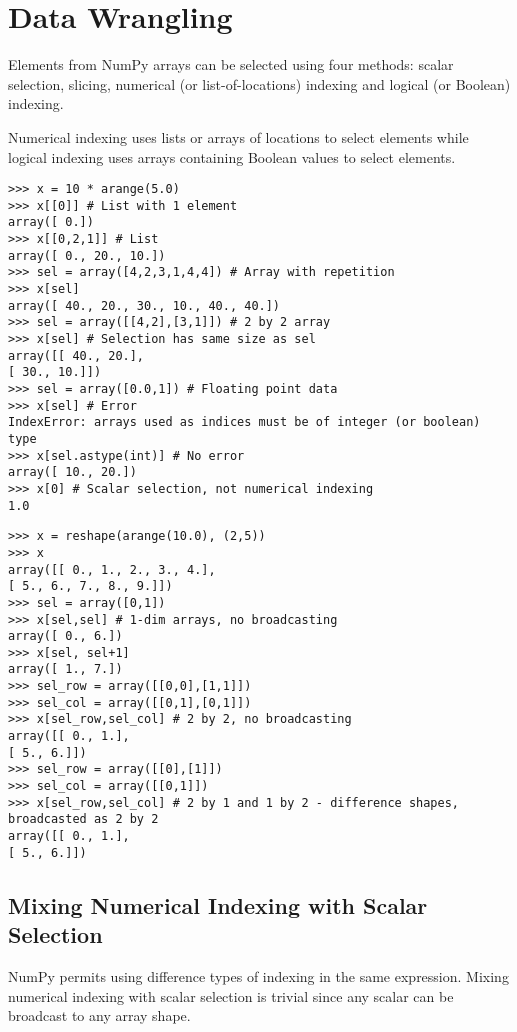 \documentclass[KSmain.tex]{subfiles}
\begin{document}
 

\section{Data Wrangling}
Elements from NumPy arrays can be selected using four methods: scalar selection, slicing, numerical (or
list-of-locations) indexing and logical (or Boolean) indexing.

Numerical indexing uses lists or arrays of locations
to select elements while logical indexing uses arrays containing Boolean values to select elements.


\begin{framed}
\begin{verbatim}
>>> x = 10 * arange(5.0)
>>> x[[0]] # List with 1 element
array([ 0.])
>>> x[[0,2,1]] # List
array([ 0., 20., 10.])
>>> sel = array([4,2,3,1,4,4]) # Array with repetition
>>> x[sel]
array([ 40., 20., 30., 10., 40., 40.])
>>> sel = array([[4,2],[3,1]]) # 2 by 2 array
>>> x[sel] # Selection has same size as sel
array([[ 40., 20.],
[ 30., 10.]])
>>> sel = array([0.0,1]) # Floating point data
>>> x[sel] # Error
IndexError: arrays used as indices must be of integer (or boolean) type
>>> x[sel.astype(int)] # No error
array([ 10., 20.])
>>> x[0] # Scalar selection, not numerical indexing
1.0

\end{verbatim}
\end{framed}


\begin{framed}
\begin{verbatim}
>>> x = reshape(arange(10.0), (2,5))
>>> x
array([[ 0., 1., 2., 3., 4.],
[ 5., 6., 7., 8., 9.]])
>>> sel = array([0,1])
>>> x[sel,sel] # 1-dim arrays, no broadcasting
array([ 0., 6.])
>>> x[sel, sel+1]
array([ 1., 7.])
>>> sel_row = array([[0,0],[1,1]])
>>> sel_col = array([[0,1],[0,1]])
>>> x[sel_row,sel_col] # 2 by 2, no broadcasting
array([[ 0., 1.],
[ 5., 6.]])
>>> sel_row = array([[0],[1]])
>>> sel_col = array([[0,1]])
>>> x[sel_row,sel_col] # 2 by 1 and 1 by 2 - difference shapes, broadcasted as 2 by 2
array([[ 0., 1.],
[ 5., 6.]])
\end{verbatim}
\end{framed}
\subsection{Mixing Numerical Indexing with Scalar Selection}
NumPy permits using difference types of indexing in the same expression. Mixing numerical indexing
with scalar selection is trivial since any scalar can be broadcast to any array shape.
\end{document}
